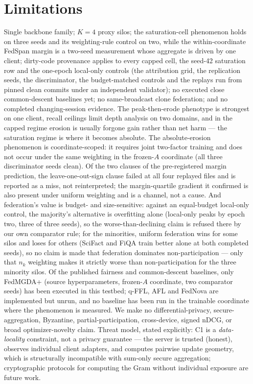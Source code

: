 \documentclass[sigconf,anonymous,review]{acmart}
\begin{document}
\section{Limitations}\label{sec:limitations}
Single backbone family; $K{=}4$ proxy silos; the saturation-cell phenomenon holds on three seeds and its weighting-rule control on two, while the within-coordinate FedSpan margin is a two-seed measurement whose aggregate is driven by one client; dirty-code provenance applies to every capped cell, the seed-42 saturation row and the one-epoch local-only controls (the attribution grid, the replication seeds, the discriminator, the budget-matched controls and the replays run from pinned clean commits under an independent validator); no executed close common-descent baselines yet; no same-broadcast clone federation; and no completed changing-session evidence. The peak-then-erode phenotype is strongest on one client, recall ceilings limit depth analysis on two domains, and in the capped regime erosion is usually forgone gain rather than net harm --- the saturation regime is where it becomes absolute. The absolute-erosion phenomenon is coordinate-scoped: it requires joint two-factor training and does not occur under the same weighting in the frozen-$A$ coordinate (all three discriminator seeds clean). Of the two clauses of the pre-registered margin prediction, the leave-one-out-sign clause failed at all four replayed files and is reported as a miss, not reinterpreted; the margin-quartile gradient it confirmed is also present under uniform weighting and is a channel, not a cause. And federation's value is budget- and size-sensitive: against an equal-budget local-only control, the majority's alternative is overfitting alone (local-only peaks by epoch two, three of three seeds), so the worse-than-declining claim is refused there by our own comparator rule; for the minorities, uniform federation wins for some silos and loses for others (SciFact and FiQA train better alone at both completed seeds), so no claim is made that federation dominates non-participation --- only that $n_k$ weighting makes it strictly worse than non-participation for the three minority silos. Of the published fairness and common-descent baselines, only FedMGDA+ (source hyperparameters, frozen-$A$ coordinate, two comparator seeds) has been executed in this testbed; q-FFL, AFL and FedNova are implemented but unrun, and no baseline has been run in the trainable coordinate where the phenomenon is measured. We make no differential-privacy, secure-aggregation, Byzantine, partial-participation, cross-device, signed nDCG, or broad optimizer-novelty claim. Threat model, stated explicitly: C1 is a \emph{data-locality} constraint, not a privacy guarantee --- the server is trusted (honest), observes individual client adapters, and computes pairwise update geometry, which is structurally incompatible with sum-only secure aggregation; cryptographic protocols for computing the Gram without individual exposure are future work.
\end{document}
